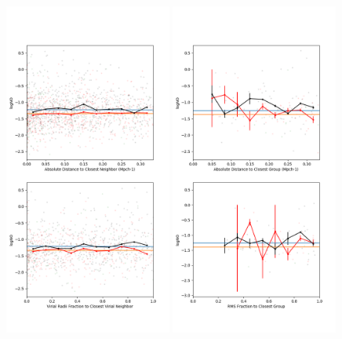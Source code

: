 \begin{figure}
    \includegraphics[width=0.49\textwidth]{Images/smallScaleEnvironment/dwarf_NO_300}
    \includegraphics[width=0.49\textwidth]{Images/smallScaleEnvironment/dwarf_NO_300_group}

\end{figure}
